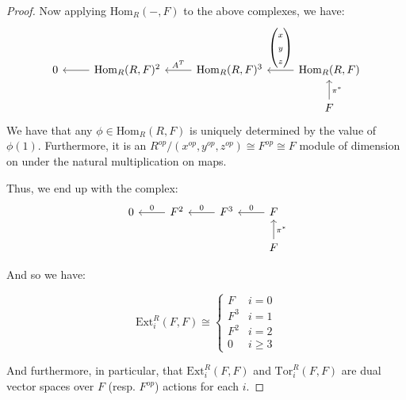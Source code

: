 \documentclass{article}
\newcommand{\Hom}{\text{Hom}}
\newcommand{\Tor}{\text{Tor}}
\newcommand{\Ext}{\text{Ext}}
\begin{document}
\begin{proof}
Now applying $\Hom_{R}(- , F)$ to the above complexes, we have:
\[
\begin{tikzcd}
0 & {\Hom_R(R,F)^2} \arrow[l] & {\Hom_R(R, F)^3} \arrow[l, "A^T"'] & {\Hom_R(R,F)} \arrow[l, "\begin{pmatrix} x \\ y \\ z \end{pmatrix}"'] \\
  &                           &                                    & F \arrow[u, "\pi^*"']                                                
\end{tikzcd}
\]
We have that any $\phi \in \Hom_{R}(R,F)$ is uniquely determined by the value of $\phi(1)$. Furthermore, it is an $R^{op}/(x^{op},y^{op},z^{op}) \cong F^{op} \cong F$ module of dimension on under the natural multiplication on maps.

Thus, we end up with the complex:
  \[
  \begin{tikzcd}
0 & F^2 \arrow[l, swap, "0"] & F^3 \arrow[l, swap, "0"] & F  \arrow[l, swap, "0"]\\
            &                    &                    & F \arrow[u, swap, "\pi^{*}"]                
\end{tikzcd}
\]

And so we have:

  \[
  \Ext_{i}^{R}(F,F) \cong
  \begin{cases}
    F & i = 0\\
    F^{3} & i = 1 \\
    F^{2} & i = 2 \\
    0 & i \geq 3 
  \end{cases}
\]

And furthermore, in particular, that $\Ext_{i}^{R}(F,F)$ and $\Tor_{i}^{R}(F,F)$ are dual vector spaces over $F$ (resp. $F^{op}$) actions for each $i$.
\end{proof}
\end{document}
